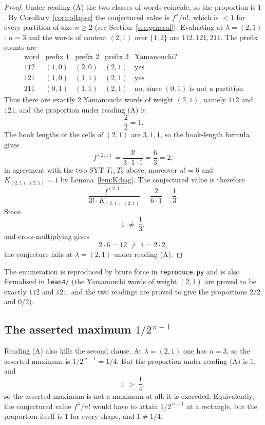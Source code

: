 \documentclass[11pt]{article}
\theoremstyle{definition}
\theoremstyle{remark}
\begin{document}
\begin{proof}
Under reading (A) the two classes of words coincide, so the proportion is
$1$. By Corollary~\ref{cor:collapse} the conjectured value is $f^\lambda/n!$,
which is $<1$ for every partition of size $n\ge 2$ (see
Section~\ref{sec:general}). Evaluating at $\lambda=(2,1)$: $n=3$ and the words
of content $(2,1)$ over $\{1,2\}$ are $112,121,211$. The prefix counts are
\[
\begin{array}{c|ccc|c}
\text{word} & \text{prefix }1 & \text{prefix }2 & \text{prefix }3 & \text{Yamanouchi?}\\
\hline
112 & (1,0) & (2,0) & (2,1) & \text{yes}\\
121 & (1,0) & (1,1) & (2,1) & \text{yes}\\
211 & (0,1) & (1,1) & (2,1) & \text{no, since } (0,1)\text{ is not a partition}
\end{array}
\]
Thus there are exactly $2$ Yamanouchi words of weight $(2,1)$, namely $112$ and
$121$, and the proportion under reading (A) is
\[
\frac{2}{2}=1 .
\]
The hook lengths of the cells of $(2,1)$ are $3,1,1$, so the hook-length
formula gives
\[
f^{(2,1)}=\frac{3!}{3\cdot1\cdot1}=\frac{6}{3}=2,
\]
in agreement with the two SYT $T_1,T_2$ above; moreover $n!=6$ and
$K_{(2,1),(2,1)}=1$ by Lemma~\ref{lem:Kdiag}. The conjectured value is
therefore
\[
\frac{f^{(2,1)}}{3!\cdot K_{(2,1),(2,1)}}=\frac{2}{6\cdot1}=\frac13 .
\]
Since
\[
1\;\ne\;\frac13,
\]
and cross-multiplying gives
\[
2\cdot 6=12\;\ne\;4=2\cdot 2,
\]
the conjecture fails at $\lambda=(2,1)$ under reading (A).
\end{proof}

The enumeration is reproduced by brute force in \texttt{reproduce.py} and is
also formalised in \texttt{lean4/} (the Yamanouchi words of weight $(2,1)$ are
proved to be exactly $112$ and $121$, and the two readings are proved to give
the proportions $2/2$ and $0/2$).

\subsection{The asserted maximum $1/2^{\,n-1}$}

Reading (A) also kills the second clause. At $\lambda=(2,1)$ one has $n=3$, so
the asserted maximum is $1/2^{\,n-1}=1/4$. But the proportion under reading (A)
is $1$, and
\[
1\;>\;\frac14,
\]
so the asserted maximum is not a maximum at all: it is exceeded. Equivalently,
the conjectured value $f^\lambda/n!$ would have to attain $1/2^{\,n-1}$ at a
rectangle, but the proportion itself is $1$ for every shape, and $1\ne1/4$.
\end{document}
